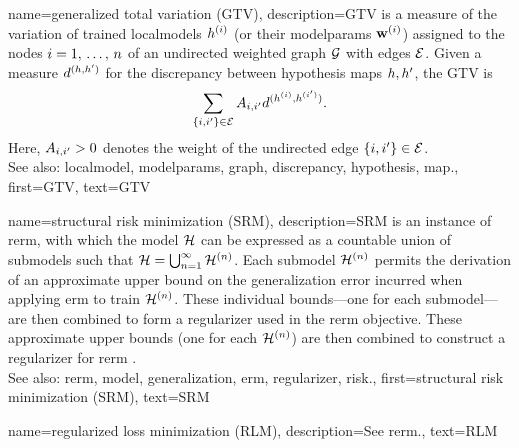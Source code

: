 	
{name={generalized total variation (GTV)}, 
	description={GTV is a 
		measure of the variation of trained \glspl{localmodel} $h^{(i)}$ 
		(or their \glspl{modelparam} $\mathbf{w}^{(i)}$) assigned to the nodes $i=1, \,\ldots, \,n$ 
		of an undirected weighted \gls{graph} $\mathcal{G}$ with edges $\mathcal{E}$. Given a measure $d^{(h,h')}$ 
		for the \gls{discrepancy} between \gls{hypothesis} \glspl{map} $h,h'$, the GTV is 
		\begin{equation} 
			\nonumber
			\sum_{\{i,i'\}\in \mathcal{E}} A_{i,i'} 
			d^{(h^{(i)},h^{(i')})}.
		\end{equation}
		Here, $A_{i,i'}>0$ denotes the weight of the undirected edge $\{i,i'\}\in \mathcal{E}$.
				\\
		See also: \gls{localmodel}, \glspl{modelparam}, \gls{graph}, \gls{discrepancy}, \gls{hypothesis}, \gls{map}.},
	first={GTV},
	text={GTV} 
}
	
{name={structural risk minimization (SRM)}, 
	description={SRM is an
		instance of \gls{rerm}, with which the \gls{model} $\mathcal{H}$ can be expressed 
		as a countable union of submodels such that $\mathcal{H} = \bigcup_{n=1}^{\infty} \mathcal{H}^{(n)}$. 
		Each submodel $\mathcal{H}^{(n)}$ permits the derivation of an approximate upper bound 
		on the \gls{generalization} error incurred when applying \gls{erm} to train $\mathcal{H}^{(n)}$. 
		These individual bounds—one for each submodel—are then combined to form a \gls{regularizer} 
		used in the \gls{rerm} objective. 
        		These approximate upper bounds (one for each $\mathcal{H}^{(n)}$) are then combined 
		to construct a \gls{regularizer} for \gls{rerm} \cite[Sec.\ 7.2]{ShalevMLBook}.
				\\
		See also: \gls{rerm}, \gls{model}, \gls{generalization}, \gls{erm}, \gls{regularizer}, \gls{risk}.},
	first={structural risk minimization (SRM)},
	text={SRM}
 }

 {name={regularized loss minimization (RLM)},
 	description={See \gls{rerm}.},
 	text={RLM}
 }
 

